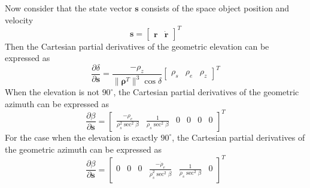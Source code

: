 Now consider that the state vector $\mathbf{s}$ consists of the
space object position and velocity
\begin{equation}
 \mathbf{s} = \begin{bmatrix} \mathbf{r} & \dot{\mathbf{r}} \end{bmatrix}^T
\end{equation}
Then the Cartesian partial derivatives of the geometric elevation
can be expressed as
\begin{equation}
\frac{\partial\delta}{\partial\mathbf{s}} = \frac{-\rho_z}{\|\boldsymbol\rho^{T}\|^{3}\cos\delta}\begin{bmatrix} \rho_s & \rho_e & \rho_z \end{bmatrix}^T
\end{equation}
When the elevation is not $90^{\circ}$, the Cartesian partial
derivatives of the geometric azimuth can be expressed as
\begin{equation}
\frac{\partial\beta}{\partial\mathbf{s}} = \begin{bmatrix}
\frac{-\rho_e}{\rho^2_s\sec^{2}\beta} & \frac{1}{\rho_s\sec^{2}\beta} & 0 & 0 & 0 & 0
\end{bmatrix}^T
\end{equation}
For the case when the elevation is exactly $90^{\circ}$, the
Cartesian partial derivatives of the geometric azimuth can be
expressed as
\begin{equation}
\frac{\partial\beta}{\partial\mathbf{s}} = \begin{bmatrix} 0 & 0 & 0 & \frac{-\dot{\rho}_e}{\dot{\rho}^2_s\sec^{2}\beta} & \frac{1}{\dot{\rho}_s\sec^{2}\beta} & 0\end{bmatrix}^T
\end{equation}

